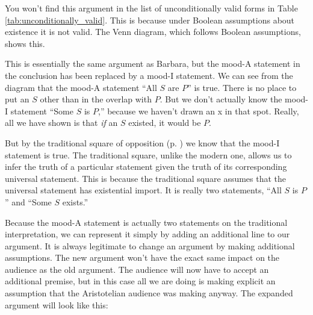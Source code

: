  
You won't find this argument in the list of unconditionally valid forms in Table \ref{tab:unconditionally_valid}. This is because under Boolean assumptions about existence it is not valid. The Venn diagram, which follows Boolean assumptions, shows this. 

\begin{center}
\end{center}

This is essentially the same argument as Barbara, but the mood-A statement in the conclusion has been replaced by a mood-I statement. We can see from the diagram that the mood-A statement ``All $S$ are $P$'' is true. There is no place to put an $S$ other than in the overlap with $P$. But we don't actually know the mood-I statement ``Some $S$ is $P$,'' because we haven't drawn an x in that spot. Really, all we have shown is that \emph{if} an $S$ existed, it would be $P$. 

But by the traditional square of opposition (p. \pageref{fig:traditionalsquare}) we know that the mood-I statement is true. The traditional square, unlike the modern one, allows us to infer the truth of a particular statement given the truth of its corresponding universal statement. This is because the traditional square assumes that the universal statement has existential import. It is really two statements, ``All $S$ is $P$'' and ``Some $S$ exists.'' 

Because the mood-A statement is actually two statements on the traditional interpretation, we can represent it simply by adding an additional line to our argument. It is always legitimate to change an argument by making additional assumptions. The new argument won't have the exact same impact on the audience as the old argument. The audience will now have to accept an additional premise, but in this case all we are doing is making explicit an assumption that the Aristotelian audience was making anyway. The expanded argument will look like this:

